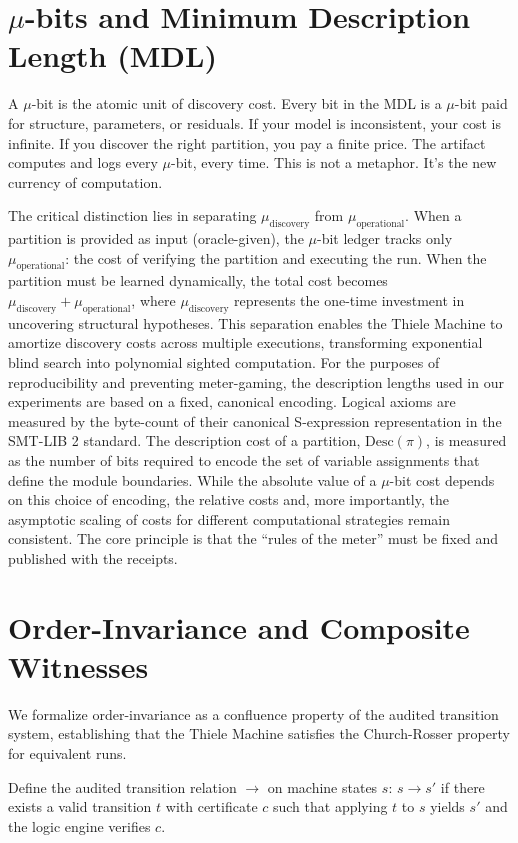 \documentclass[11pt]{article}
\begin{document}
\section{$\mu$-bits and Minimum Description Length (MDL)}
A $\mu$-bit is the atomic unit of discovery cost. Every bit in the MDL is a $\mu$-bit paid for structure, parameters, or residuals. If your model is inconsistent, your cost is infinite. If you discover the right partition, you pay a finite price. The artifact computes and logs every $\mu$-bit, every time. This is not a metaphor. It’s the new currency of computation.

The critical distinction lies in separating $\mu_{\text{discovery}}$ from $\mu_{\text{operational}}$. When a partition is provided as input (oracle-given), the $\mu$-bit ledger tracks only $\mu_{\text{operational}}$: the cost of verifying the partition and executing the run. When the partition must be learned dynamically, the total cost becomes $\mu_{\text{discovery}} + \mu_{\text{operational}}$, where $\mu_{\text{discovery}}$ represents the one-time investment in uncovering structural hypotheses. This separation enables the Thiele Machine to amortize discovery costs across multiple executions, transforming exponential blind search into polynomial sighted computation.
For the purposes of reproducibility and preventing meter-gaming, the description lengths used in our experiments are based on a fixed, canonical encoding. Logical axioms are measured by the byte-count of their canonical S-expression representation in the SMT-LIB 2 standard. The description cost of a partition, $\mathrm{Desc}(\pi)$, is measured as the number of bits required to encode the set of variable assignments that define the module boundaries. While the absolute value of a $\mu$-bit cost depends on this choice of encoding, the relative costs and, more importantly, the asymptotic scaling of costs for different computational strategies remain consistent. The core principle is that the ``rules of the meter'' must be fixed and published with the receipts.

\section{Order-Invariance and Composite Witnesses}

We formalize order-invariance as a confluence property of the audited transition system, establishing that the Thiele Machine satisfies the Church-Rosser property for equivalent runs.

Define the audited transition relation $\rightarrow$ on machine states $s$: $s \rightarrow s'$ if there exists a valid transition $t$ with certificate $c$ such that applying $t$ to $s$ yields $s'$ and the logic engine verifies $c$.
\end{document}
